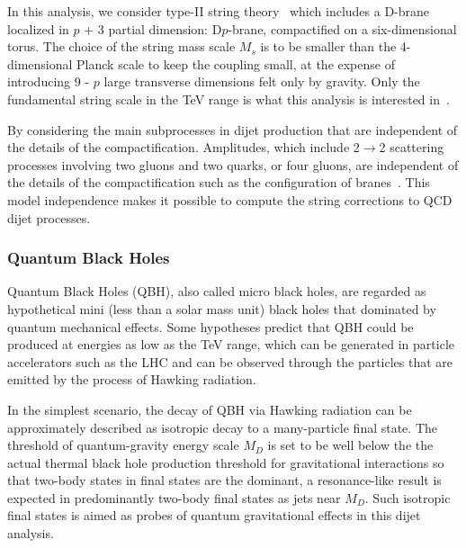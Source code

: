 \documentclass[UTF8,12pt]{ctexart}
\numberwithin{equation}{section}
\def\to{\rightarrow}
\begin{document}
In this analysis, we consider type-II string theory~\cite{StringBook} which includes a D-brane localized in $p$ + 3 partial dimension: D$p$-brane, compactified on a six-dimensional torus. The choice of the string mass scale $M_s$ is to be smaller than the 4-dimensional Planck scale to keep the coupling small, at the expense of introducing 9 - $p$ large transverse dimensions felt only by gravity. Only the fundamental string scale in the TeV range is what this analysis is interested in~\cite{Cullen:2000ef}.


By considering the main subprocesses in dijet production that are independent of the details of the compactification. Amplitudes, which include 2$\to$2 scattering processes involving two gluons and two quarks, or four gluons,  are independent of the details of the compactification such as the configuration of branes~\cite{Lust:2008qc}. This model independence makes it possible to compute the string corrections to QCD dijet processes.


\subsubsection{Quantum Black Holes}
\label{sec:2.2.3}

Quantum Black Holes (QBH), also called micro black holes, are regarded as hypothetical mini (less than a solar mass unit) black holes that dominated by quantum mechanical effects. Some hypotheses predict that QBH could be produced at energies as low as the TeV range, which can be generated in particle accelerators such as the LHC and can be observed through the particles that are emitted by the process of Hawking radiation.


In the simplest scenario, the decay of QBH via Hawking radiation can be approximately described as isotropic decay to a many-particle final state.  The threshold of quantum-gravity energy scale $M_D$ is set to be well below the 
the actual thermal black hole production threshold for gravitational interactions so that two-body states in final states are the dominant, a resonance-like result is expected in predominantly two-body final states as jets near $M_D$. Such isotropic final states is aimed as probes of quantum gravitational effects in this dijet analysis.
\end{document}
